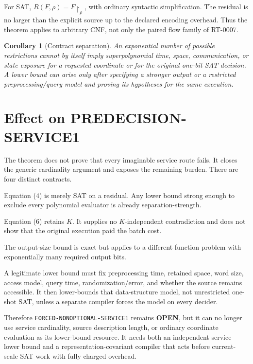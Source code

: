 \documentclass[11pt]{article}
\newtheorem{corollary}[theorem]{Corollary}
\newcommand{\OPEN}{\textbf{OPEN}}
\begin{document}
For SAT, $R(F,\rho)=F\!\upharpoonright_\rho$, with ordinary syntactic
simplification.  The residual is no larger than the explicit source up to the
declared encoding overhead.  Thus the theorem applies to arbitrary CNF, not
only the paired flow family of RT-0007.

\begin{corollary}[Contract separation]
An exponential number of possible restrictions cannot by itself imply
superpolynomial time, space, communication, or state exposure for a requested
coordinate or for the original one-bit SAT decision.  A lower bound can arise
only after specifying a stronger output or a restricted preprocessing/query
model and proving its hypotheses for the same execution.
\end{corollary}

\section{Effect on PREDECISION-SERVICE1}

The theorem does not prove that every imaginable service route fails.  It
closes the generic cardinality argument and exposes the remaining burden.
There are four distinct contracts.

\begin{description}[leftmargin=3.3cm,style=nextline]
\item[One requested coordinate.] Equation (4) is merely SAT on a residual.
Any lower bound strong enough to exclude every polynomial evaluator is
already separation-strength.
\item[Polynomial batch.] Equation (6) retains $K$.  It supplies no
$K$-independent contradiction and does not show that the original execution
paid the batch cost.
\item[Full explicit table.] The output-size bound is exact but applies to a
different function problem with exponentially many required output bits.
\item[Preprocessing/query structure.] A legitimate lower bound must fix
preprocessing time, retained space, word size, access model, query time,
randomization/error, and whether the source remains accessible.  It then
lower-bounds that data-structure model, not unrestricted one-shot SAT, unless
a separate compiler forces the model on every decider.
\end{description}

Therefore \texttt{FORCED-NONOPTIONAL-SERVICE1} remains \OPEN, but it can no
longer use service cardinality, source description length, or ordinary
coordinate evaluation as its lower-bound resource.  It needs both an
independent service lower bound and a representation-covariant compiler that
acts before current-scale SAT work with fully charged overhead.
\end{document}
